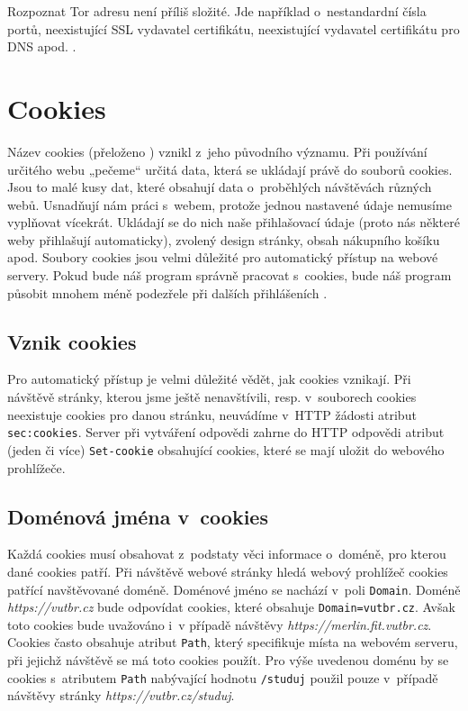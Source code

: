Rozpoznat Tor adresu není příliš složité. Jde například o~nestandardní čísla portů, neexistující SSL vydavatel certifikátu, neexistující vydavatel certifikátu pro DNS apod. \cite{bib:tor_recognition}.

\section{Cookies}
\label{sec:cookies}
Název cookies (přeloženo ) vznikl z~jeho původního významu. Při používání určitého webu „pečeme“ určitá data, která se ukládají právě do souborů cookies. Jsou to malé kusy dat, které obsahují data o~proběhlých návštěvách různých webů. Usnadňují nám práci s~webem, protože jednou nastavené údaje nemusíme vyplňovat vícekrát. Ukládají se do nich naše přihlašovací údaje (proto nás některé weby přihlašují automaticky), zvolený design stránky, obsah nákupního košíku apod.
Soubory cookies jsou velmi důležité pro automatický přístup na webové servery. Pokud bude náš program správně pracovat s~cookies, bude náš program působit mnohem méně podezřele při dalších přihlášeních \cite{bib:developerMozilla}.

\subsection*{Vznik cookies}
Pro automatický přístup je velmi důležité vědět, jak cookies vznikají. Při návštěvě stránky, kterou jsme ještě nenavštívili, resp. v~souborech cookies neexistuje cookies pro danou stránku, neuvádíme v~HTTP žádosti atribut \texttt{sec:cookies}. Server při vytváření odpovědi zahrne do HTTP odpovědi atribut (jeden či více) \texttt{Set-cookie} obsahující cookies, které se mají uložit do webového prohlížeče.

\subsection*{Doménová jména v~cookies}
Každá cookies musí obsahovat z~podstaty věci informace o~doméně, pro kterou dané cookies patří. Při návštěvě webové stránky hledá webový prohlížeč cookies patřící navštěvované doméně. Doménové jméno se nachází v~poli \texttt{Domain}. Doméně \textit{https://vutbr.cz} bude odpovídat cookies, které obsahuje \texttt{Domain=vutbr.cz}. Avšak toto cookies bude uvažováno i~v případě návštěvy \textit{https://merlin.fit.vutbr.cz}. Cookies často obsahuje atribut \texttt{Path}, který specifikuje místa na webovém serveru, při jejichž návštěvě se má toto cookies použít. Pro výše uvedenou doménu by se cookies s~atributem \texttt{Path} nabývající hodnotu \texttt{/studuj} použil pouze v~případě návštěvy stránky \textit{https://vutbr.cz/studuj}.

